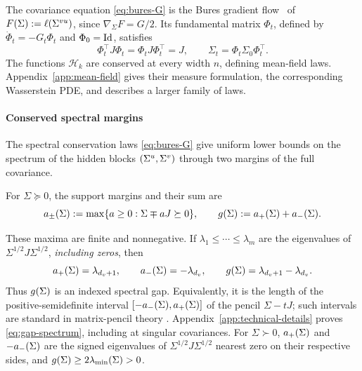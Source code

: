 The covariance equation \eqref{eq:bures-G} is the Bures gradient
flow~\citep{Takatsu2011,BhatiaJainLim2019} of
$F(\Sigma):=\ell(\Sigma^{vu})$, since $\nabla_\Sigma F=G/2$.
Its fundamental matrix $\Phi_t$, defined by $\dot\Phi_t=-G_t\Phi_t$ and $\Phi_0=\mathrm{Id}$, satisfies
\begin{equation}\label{eq:orbit}
 \Phi_t^\top J\Phi_t=  \Phi_tJ\Phi_t^\top=J,\qquad
 \Sigma_t=\Phi_t\Sigma_0\Phi_t^\top.
\end{equation}
The functions $\mathcal H_k$ are conserved at every width $n$, defining mean-field laws.
Appendix~\ref{app:mean-field} gives their measure formulation, the corresponding Wasserstein PDE, and describes a larger family of laws.

\paragraph{Conserved spectral margins}
The spectral conservation laws \eqref{eq:bures-G} give uniform lower bounds on the spectrum of the hidden blocks $(\Sigma^u, \Sigma^v)$ through two margins
of the full covariance.
\begin{definition}\label{def:support-gap}
For $\Sigma\succeq0$, the support margins and their sum are
\setlength{\abovedisplayskip}{2pt}
\setlength{\belowdisplayskip}{2pt}
\setlength{\abovedisplayshortskip}{0pt}
\setlength{\belowdisplayshortskip}{2pt}
\begin{equation}\label{eq:margins}
 a_\pm(\Sigma):=\max\{a\ge0:\Sigma\mp aJ\succeq0\},\qquad
 g(\Sigma):=a_+(\Sigma)+a_-(\Sigma).
\end{equation}
\end{definition}
These maxima are finite and nonnegative. If $\lambda_1\le\cdots\le\lambda_m$
are the eigenvalues of $\Sigma^{1/2}J\Sigma^{1/2}$, \emph{including zeros}, then
\begin{equation}\label{eq:gap-spectrum}
 a_+(\Sigma)=\lambda_{d_v+1},\qquad
 a_-(\Sigma)=-\lambda_{d_v},\qquad
 g(\Sigma)=\lambda_{d_v+1}-\lambda_{d_v}.
\end{equation}
Thus $g(\Sigma)$ is an indexed spectral gap. Equivalently, it is the
length of the positive-semidefinite interval
$[-a_-(\Sigma),a_+(\Sigma)]$ of the pencil $\Sigma-tJ$;
such intervals are standard in matrix-pencil theory
\citep{NguyenNguyen2023}. Appendix~\ref{app:technical-details} proves
\eqref{eq:gap-spectrum}, including at singular covariances.
For $\Sigma\succ0$, $a_+(\Sigma)$ and $-a_-(\Sigma)$ are the
signed eigenvalues of $\Sigma^{1/2} J \Sigma^{1/2}$ nearest zero on their respective sides, and
$g(\Sigma)\ge2\lambda_{\min}(\Sigma)>0$.

